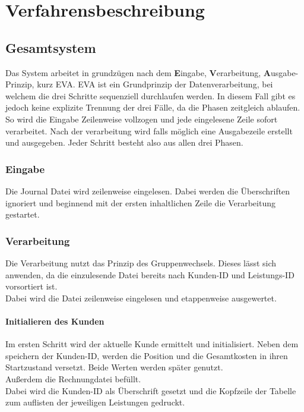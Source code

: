 \chapter{Verfahrensbeschreibung}\label{ch:verfahrensbeschreibung}


\section{Gesamtsystem}\label{sec:gesamtsystem}
Das System arbeitet in grundzügen nach dem \textbf{E}ingabe, \textbf{V}erarbeitung, \textbf{A}usgabe-Prinzip, kurz EVA.
EVA ist ein Grundprinzip der Datenverarbeitung, bei welchem die drei Schritte sequenziell durchlaufen werden.
In diesem Fall gibt es jedoch keine explizite Trennung der drei Fälle, da die Phasen zeitgleich ablaufen. So wird die Eingabe Zeilenweise vollzogen und jede eingelesene Zeile sofort verarbeitet. Nach der verarbeitung wird falls möglich eine Ausgabezeile erstellt und ausgegeben. Jeder Schritt besteht also aus allen drei Phasen.\\

\subsection{Eingabe}\label{subsec:eingabe}
Die Journal Datei wird zeilenweise eingelesen. Dabei werden die Überschriften ignoriert und beginnend mit der ersten inhaltlichen Zeile die Verarbeitung gestartet.\\

\subsection{Verarbeitung}\label{subsec:verarbeitung}
Die Verarbeitung nutzt das Prinzip des Gruppenwechsels. Dieses lässt sich anwenden, da die einzulesende Datei bereits nach Kunden-ID und Leistungs-ID vorsortiert ist.\\
Dabei wird die Datei zeilenweise eingelesen und etappenweise ausgewertet.

\subsubsection{Initialieren des Kunden}\label{subsubsec:initialisieren-des-kunden}
Im ersten Schritt wird der aktuelle Kunde ermittelt und initialisiert. Neben dem speichern der Kunden-ID, werden die Position und die Gesamtkosten in ihren Startzustand versetzt. Beide Werten werden später genutzt.\\
Außerdem die Rechnungdatei befüllt.\\
Dabei wird die Kunden-ID als Überschrift gesetzt und die Kopfzeile der Tabelle zum auflisten der jeweiligen Leistungen gedruckt.\\

